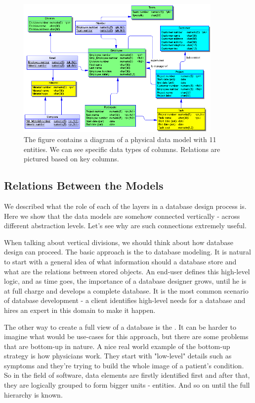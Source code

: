 \begin{figure}[H]
	\centering
	\includegraphics[width=10cm]{../img/Physical_Model_PowerDesigner}
	\caption[Physical diagram\cite{PowerDesignerDocumentation}]{The figure contains a diagram of a physical data model with 11 entities. We can see specific data types of columns. Relations are pictured based on key columns.}
\end{figure}

\subsection{Relations Between the Models}

We described what the role of each of the layers in a database design process is.
Here we show that the data models are somehow connected vertically - across different abstraction levels. Let's see why are such connections extremely useful.

When talking about vertical divisions, we should think about how database design can proceed.
The basic approach is the  to database modeling.
It is natural to start with a general idea of what information should a database store and what are the relations between stored objects. 
An end-user defines this high-level logic, and as time goes, the importance of a database designer grows, until he is at full charge and develops a complete database. It is the most common scenario of database development - a client identifies high-level needs for a database and hires an expert in this domain to make it happen.

The other way to create a full view of a database is the . It can be harder to imagine what would be use-cases for this approach, but there are some problems that are bottom-up in nature. A nice real world example of the bottom-up strategy is how physicians work. 
They start with "low-level" details such as symptoms and they're trying to build the whole image of a patient's condition. So in the field of software, data elements are firstly identified first and after that, they are logically grouped to form bigger units - entities. And so on until the full hierarchy is known.

